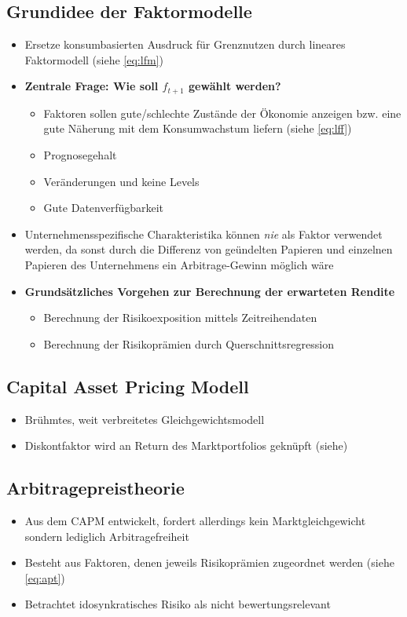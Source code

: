 \subsection{Grundidee der Faktormodelle}
\begin{itemize}
	\item Ersetze konsumbasierten Ausdruck für Grenznutzen durch lineares Faktormodell (siehe \ref{eq:lfm})
	\item \textbf{Zentrale Frage: Wie soll \(f_{t+1}\) gewählt werden?}
	\begin{itemize}
		\item Faktoren sollen gute/schlechte Zustände der Ökonomie anzeigen bzw. eine gute Näherung mit dem Konsumwachstum liefern (siehe \ref{eq:lff})
		\item Prognosegehalt
		\item Veränderungen und keine Levels
		\item Gute Datenverfügbarkeit
	\end{itemize}
	\item Unternehmensspezifische Charakteristika können \textit{nie} als Faktor verwendet werden, da sonst durch die Differenz von geündelten Papieren und einzelnen Papieren des Unternehmens ein Arbitrage-Gewinn möglich wäre
	\item \textbf{Grundsätzliches Vorgehen zur Berechnung der erwarteten Rendite}
	\begin{itemize}
		\item Berechnung der Risikoexposition mittels Zeitreihendaten
		\item Berechnung der Risikoprämien durch Querschnittsregression
	\end{itemize}
\end{itemize}


\subsection{Capital Asset Pricing Modell}
\begin{itemize}
	\item Brühmtes, weit verbreitetes Gleichgewichtsmodell
	\item Diskontfaktor wird an Return des Marktportfolios geknüpft (siehe)
\end{itemize}


\subsection{Arbitragepreistheorie}
\begin{itemize}
	\item Aus dem CAPM entwickelt, fordert allerdings kein Marktgleichgewicht sondern lediglich Arbitragefreiheit
	\item Besteht aus Faktoren, denen jeweils Risikoprämien zugeordnet werden (siehe \ref{eq:apt})
	\item Betrachtet idosynkratisches Risiko als nicht bewertungsrelevant
\end{itemize}

